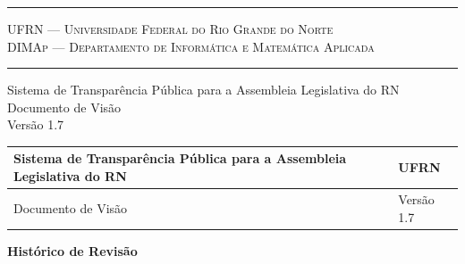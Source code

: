 \documentclass[12pt, a4paper]{article}
\begin{document}
    \begin{titlepage}
        \flushright
        \rule{\textwidth}{1pt}
        {\large \textsc{UFRN --- Universidade Federal do Rio Grande do Norte
                \\[0.5ex]
         \normalsize DIMAp --- Departamento de Informática e Matemática Aplicada}
        \vspace{-1ex}}
        \rule{\textwidth}{1pt}

        \vfill

        {\Huge Sistema de Transparência Pública para a Assembleia Legislativa
        do RN \\[1ex] \LARGE Documento de Visão \\[2ex] \large Versão 1.7}

        \vfill

    \end{titlepage}

    \begin{tabu}{X | X[-1]}
        \hline
        Sistema de Transparência Pública para a Assembleia Legislativa do RN &
        UFRN
        \\ \hline

        Documento de Visão &
        Versão 1.7
        \\ \hline
    \end{tabu}

    \bigskip

    {\Large\textbf{Histórico de Revisão}}

    \vspace{2ex}
\end{document}
